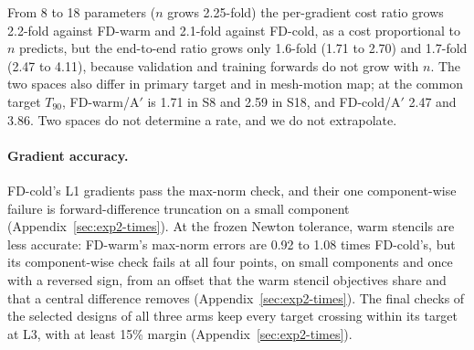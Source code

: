 From 8 to 18 parameters ($n$ grows 2.25-fold) the per-gradient cost ratio
grows 2.2-fold against FD-warm and 2.1-fold against FD-cold, as a cost
proportional to $n$ predicts, but the end-to-end ratio grows only
1.6-fold (1.71 to 2.70) and 1.7-fold (2.47 to 4.11), because validation
and training forwards do not grow with $n$. The two spaces also differ in
primary target and in mesh-motion map; at the common target $T_{90}$,
FD-warm/A$'$ is 1.71 in S8 and 2.59 in S18, and FD-cold/A$'$ 2.47 and
3.86. Two spaces do not determine a rate, and we do not extrapolate.

\paragraph{Gradient accuracy.}
FD-cold's L1 gradients pass the max-norm check, and their one component-wise
failure is forward-difference truncation on a small component
(Appendix~\ref{sec:exp2-times}). At the frozen Newton tolerance, warm
stencils are less accurate: FD-warm's max-norm errors are 0.92 to 1.08
times FD-cold's, but its component-wise check fails at all four points, on
small components and once with a reversed sign, from an offset that the
warm stencil objectives share and that a central difference removes
(Appendix~\ref{sec:exp2-times}). The final checks of the selected
designs of all three arms keep every target crossing within its target at
L3, with at least 15\% margin (Appendix~\ref{sec:exp2-times}).